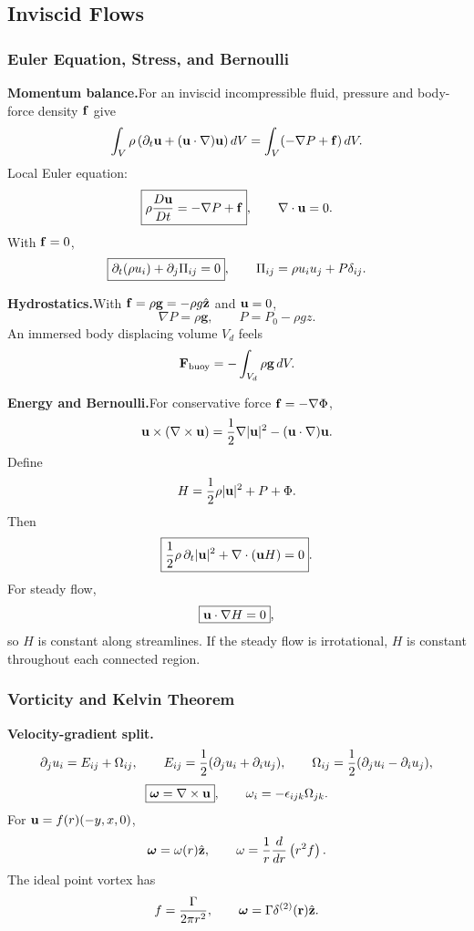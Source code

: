 \subsection{Inviscid Flows}

\subsubsection*{Euler Equation, Stress, and Bernoulli}

\noindent\textbf{Momentum balance.}\quad For an inviscid incompressible fluid, pressure and body-force density $\mathbf{f}$ give
\[
  \int_V\rho\left(\partial_t\mathbf{u}+(\mathbf{u}\cdot\nabla)\mathbf{u}\right)dV
  =\int_V(-\nabla P+\mathbf{f})\,dV.
\]
Local Euler equation:
\[
  \boxed{\rho\frac{D\mathbf{u}}{Dt}=-\nabla P+\mathbf{f}},
  \qquad
  \nabla\cdot\mathbf{u}=0.
\]
With $\mathbf{f}=0$,
\[
  \boxed{\partial_t(\rho u_i)+\partial_j\Pi_{ij}=0},
  \qquad
  \Pi_{ij}=\rho u_i u_j+P\delta_{ij}.
\]

\noindent\textbf{Hydrostatics.}\quad With $\mathbf{f}=\rho\mathbf g=-\rho g\hat{\mathbf z}$ and $\mathbf{u}=0$,
\[
  \boxed{\nabla P=\rho\mathbf g},
  \qquad
  P=P_0-\rho gz.
\]
An immersed body displacing volume $V_d$ feels
\[
  \mathbf F_{\rm buoy}=-\int_{V_d}\rho\mathbf g\,dV.
\]

\noindent\textbf{Energy and Bernoulli.}\quad For conservative force $\mathbf{f}=-\nabla\Phi$,
\[
  \mathbf{u}\times(\nabla\times\mathbf{u})
  =\frac{1}{2}\nabla|\mathbf{u}|^2-(\mathbf{u}\cdot\nabla)\mathbf{u}.
\]
Define
\[
  H=\frac{1}{2}\rho|\mathbf{u}|^2+P+\Phi.
\]
Then
\[
  \boxed{\frac{1}{2}\rho\,\partial_t|\mathbf{u}|^2+\nabla\cdot(\mathbf{u} H)=0}.
\]
For steady flow,
\[
  \boxed{\mathbf{u}\cdot\nabla H=0},
\]
so $H$ is constant along streamlines. If the steady flow is irrotational, $H$ is constant throughout each connected region.

\subsubsection*{Vorticity and Kelvin Theorem}

\noindent\textbf{Velocity-gradient split.}\quad
\[
  \partial_j u_i=E_{ij}+\Omega_{ij},
  \qquad
  E_{ij}=\frac{1}{2}(\partial_j u_i+\partial_i u_j),
  \qquad
  \Omega_{ij}=\frac{1}{2}(\partial_j u_i-\partial_i u_j),
\]
\[
  \boxed{\boldsymbol{\omega}=\nabla\times\mathbf{u}},
  \qquad
  \omega_i=-\epsilon_{ijk}\Omega_{jk}.
\]
For $\mathbf{u}=f(r)(-y,x,0)$,
\[
  \boldsymbol{\omega}=\omega(r)\hat{\mathbf z},
  \qquad
  \omega=\frac1r\frac{d}{dr}\left(r^2f\right).
\]
The ideal point vortex has
\[
  f=\frac{\Gamma}{2\pi r^2},
  \qquad
  \boldsymbol{\omega}=\Gamma\delta^{(2)}(\mathbf r)\hat{\mathbf z}.
\]

